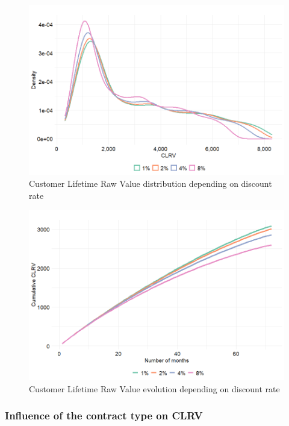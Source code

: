 \documentclass[
]{book}
\begin{document}
\begin{figure}

{\centering \includegraphics[width=12.5in]{./imgs/clrv_dens_discount_rate} 

}

\caption{Customer Lifetime Raw Value distribution depending on discount rate}\label{fig:clrvDensDiscount}
\end{figure}

\begin{figure}

{\centering \includegraphics[width=12.5in]{./imgs/clrv_evolution_discount} 

}

\caption{Customer Lifetime Raw Value evolution depending on discount rate}\label{fig:clrvEvolDiscount}
\end{figure}

\hypertarget{influence-of-the-contract-type-on-clrv}{%
\subsubsection*{Influence of the contract type on CLRV}\label{influence-of-the-contract-type-on-clrv}}
\end{document}

